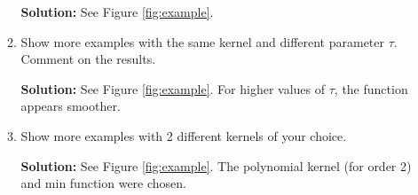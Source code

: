 \documentclass{article}[12pt]
\begin{document}
\begin{enumerate}
\begin{enumerate}
\textbf{Solution:} See Figure \ref{fig:example}.

\item Show more examples with the same kernel and different parameter $\tau$. Comment on the results. 

\textbf{Solution:} See Figure \ref{fig:example}. For higher values of $\tau$, the function appears smoother. 

\item Show more examples with 2 different kernels of your choice. 

\textbf{Solution:} See Figure \ref{fig:example}. The polynomial kernel (for order 2) and min function were chosen.

\begin{figure}%
    \centering
    \qquad

\end{figure}
\end{enumerate}
\end{enumerate}
\end{document}
